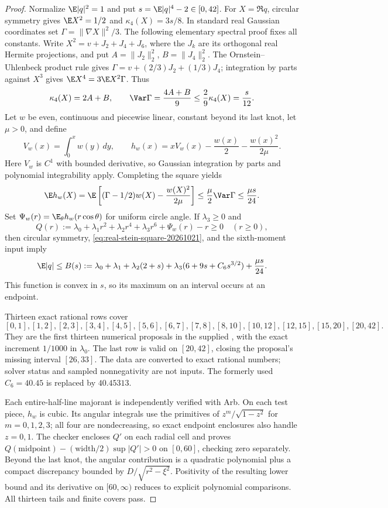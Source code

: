 \begin{proof}
Normalize $\E|q|^2=1$ and put $s=\E|q|^4-2\in[0,42]$.
For $X=\Re q$, circular symmetry gives $\E X^2=1/2$ and
$\kappa_4(X)=3s/8$. In standard real Gaussian coordinates set
$\Gamma=\|\nabla X\|^2/3$. The following elementary spectral proof fixes
all constants. Write $X^2=v+J_2+J_4+J_6$, where the $J_k$ are its
orthogonal real Hermite projections, and put $A=\|J_2\|_2^2$,
$B=\|J_4\|_2^2$. The Ornstein--Uhlenbeck product rule gives
$\Gamma=v+(2/3)J_2+(1/3)J_4$; integration by parts against $X^3$
gives $\E X^4=3\E X^2\Gamma$. Thus
\[
 \kappa_4(X)=2A+B,\qquad
 \Var\Gamma=\frac{4A+B}{9}\le\frac29\kappa_4(X)=\frac{s}{12}.
\]
Let $w$ be even, continuous and piecewise linear, constant beyond its
last knot, let $\mu>0$, and define
\[
 V_w(x)=\int_0^x w(y)\,dy,\qquad
 h_w(x)=xV_w(x)-\frac{w(x)}2-\frac{w(x)^2}{2\mu}.
\]
Here $V_w$ is $C^1$ with bounded derivative, so Gaussian integration
by parts and polynomial integrability apply. Completing the square yields
\begin{equation}\label{eq:real-stein-square-20261021}
 \E h_w(X)=\E\left[(\Gamma-1/2)w(X)-\frac{w(X)^2}{2\mu}\right]
 \le\frac{\mu}{2}\Var\Gamma\le\frac{\mu s}{24}.
\end{equation}
Set $\Psi_w(r)=\E_\theta h_w(r\cos\theta)$ for uniform circle angle.
If $\lambda_3\ge0$ and
\begin{equation}\label{eq:real-stein-majorant-20261021}
 Q(r):=\lambda_0+\lambda_1r^2+\lambda_2r^4+\lambda_3r^6
       +\Psi_w(r)-r\ge0\quad(r\ge0),
\end{equation}
then circular symmetry, \eqref{eq:real-stein-square-20261021}, and the
sixth-moment input imply
\[
 \E|q|\le B(s):=\lambda_0+\lambda_1+\lambda_2(2+s)
 +\lambda_3(6+9s+C_6s^{3/2})+\frac{\mu s}{24}.
\]
This function is convex in $s$, so its maximum on an interval occurs
at an endpoint.

Thirteen exact rational rows cover
\[
 [0,1],[1,2],[2,3],[3,4],[4,5],[5,6],[6,7],[7,8],
 [8,10],[10,12],[12,15],[15,20],[20,42].
\]
They are the first thirteen numerical proposals in the supplied
, with the exact increment $1/1000$
in $\lambda_0$. The last row is valid on $[20,42]$, closing the
proposal's missing interval $[26,33]$. The data are converted to exact
rational numbers; solver status and sampled nonnegativity are not inputs.
The formerly used $C_6=40.45$ is replaced by $40.45313$.

Each entire-half-line majorant is independently verified with Arb.
On each test piece, $h_w$ is cubic. Its angular integrals use the
primitives of $z^m/\sqrt{1-z^2}$ for $m=0,1,2,3$; all four are
nondecreasing, so exact endpoint enclosures also handle $z=0,1$.
The checker encloses $Q'$ on each radial cell and proves
$Q(\mathrm{midpoint})-(\mathrm{width}/2)\sup|Q'|>0$ on $[0,60]$,
checking zero separately. Beyond the last knot, the angular contribution
is a quadratic polynomial plus a compact discrepancy bounded by
$D/\sqrt{r^2-\xi^2}$. Positivity of the resulting lower bound and its
derivative on $[60,\infty)$ reduces to explicit polynomial comparisons.
All thirteen tails and finite covers pass.


\end{proof}
